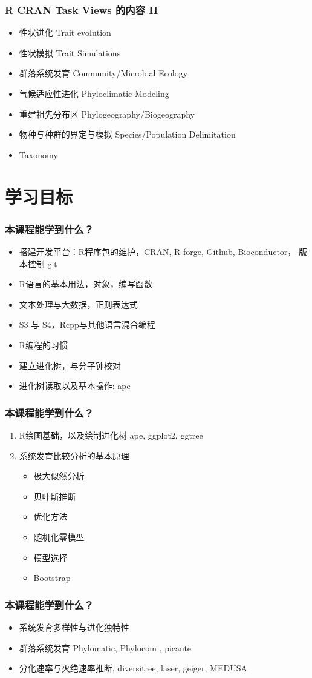 \documentclass[UTF8]{beamer}
\begin{document}
\begin{frame}
\frametitle{R CRAN Task Views 的内容 II}

\begin{itemize}
\item 性状进化 Trait evolution
\item 性状模拟 Trait Simulations
\item 群落系统发育 Community/Microbial Ecology
\item 气候适应性进化 Phyloclimatic Modeling
\item 重建祖先分布区 Phylogeography/Biogeography
\item 物种与种群的界定与模拟 Species/Population Delimitation

\item Taxonomy
\end{itemize}  
\end{frame}

\section{学习目标}
\begin{frame}
\frametitle{本课程能学到什么？}
\begin{itemize}
\item 搭建开发平台：R程序包的维护，CRAN, R-forge, Github, Bioconductor， 版本控制 git
\item R语言的基本用法，对象，编写函数
\item 文本处理与大数据，正则表达式
\item S3 与 S4，Rcpp与其他语言混合编程
\item R编程的习惯
\item 建立进化树，与分子钟校对
\item 进化树读取以及基本操作: ape
\end{itemize}
\end{frame}


\begin{frame}
\frametitle{本课程能学到什么？}
\begin{enumerate}
\item R绘图基础，以及绘制进化树 ape, ggplot2, ggtree
\item 系统发育比较分析的基本原理 
\begin{itemize}
\item 极大似然分析
\item 贝叶斯推断
\item 优化方法
\item 随机化零模型
\item 模型选择
\item Bootstrap
\end{itemize}
\end{enumerate}
\end{frame}

\begin{frame}
\frametitle{本课程能学到什么？}
\begin{itemize}
\item 系统发育多样性与进化独特性
\item 群落系统发育 Phylomatic, Phylocom , picante
\item 分化速率与灭绝速率推断, diversitree, laser, geiger, MEDUSA
\end{itemize}
\end{frame}
\end{document}
